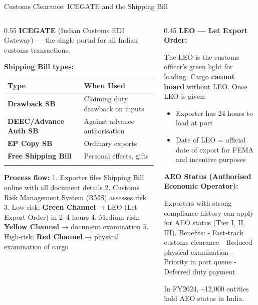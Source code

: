 \documentclass[
  ignorenonframetext,
  aspectratio=169,
]{beamer}
\makeatletter
\providecommand{\tightlist}{%
  \setlength{\itemsep}{0pt}\setlength{\parskip}{0pt}}
\let\quarto@originallabel\label
\DeclareRobustCommand*{\label}[1]{\quarto@originallabel{#1}}
\makeatother
\begin{document}
\begin{frame}
\begin{block}{Customs Clearance: ICEGATE and the Shipping Bill}
\label{customs-clearance-icegate-and-the-shipping-bill}
\begin{columns}[T]
\begin{column}{0.55\linewidth}
\textbf{ICEGATE} (Indian Customs EDI Gateway) --- the single portal for
all Indian customs transactions.

\textbf{Shipping Bill types:}

\begin{longtable}[]{@{}ll@{}}
\toprule\noalign{}
Type & When Used \\
\midrule\noalign{}
\endhead
\textbf{Drawback SB} & Claiming duty drawback on inputs \\
\textbf{DEEC/Advance Auth SB} & Against advance authorisation \\
\textbf{EP Copy SB} & Ordinary exports \\
\textbf{Free Shipping Bill} & Personal effects, gifts \\
\bottomrule\noalign{}
\end{longtable}

\textbf{Process flow:} 1. Exporter files Shipping Bill online with all
document details 2. Customs Risk Management System (RMS) assesses risk
3. Low-risk: \textbf{Green Channel} → LEO (Let Export Order) in 2--4
hours 4. Medium-risk: \textbf{Yellow Channel} → document examination 5.
High-risk: \textbf{Red Channel} → physical examination of cargo
\end{column}

\begin{column}{0.45\linewidth}
\textbf{LEO --- Let Export Order:}

The LEO is the customs officer's green light for loading. Cargo
\textbf{cannot board} without LEO. Once LEO is given:

\begin{itemize}
\tightlist
\item
  Exporter has 24 hours to load at port
\item
  Date of LEO = official date of export for FEMA and incentive purposes
\end{itemize}

\textbf{AEO Status (Authorised Economic Operator):}

Exporters with strong compliance history can apply for AEO status (Tier
I, II, III). Benefits: - Fast-track customs clearance - Reduced physical
examination - Priority in port queue - Deferred duty payment

In FY2024, \textasciitilde12,000 entities hold AEO status in India.
\end{column}
\end{columns}
\end{block}
\end{frame}
\end{document}
